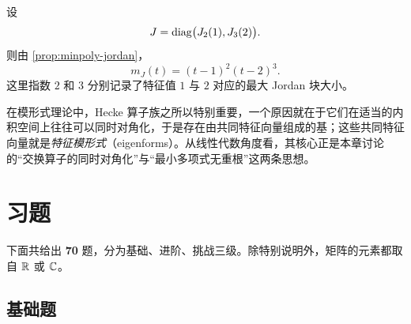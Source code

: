 \begin{example}
设
\[
J=\mathrm{diag}\bigl(J_2(1),J_3(2)\bigr).
\]
则由 \cref{prop:minpoly-jordan}，
\[
m_J(t)=(t-1)^2(t-2)^3.
\]
这里指数 \(2\) 和 \(3\) 分别记录了特征值 \(1\) 与 \(2\) 对应的最大 Jordan 块大小。
\end{example}

\begin{remark}
在模形式理论中，Hecke 算子族之所以特别重要，一个原因就在于它们在适当的内积空间上往往可以同时对角化，于是存在由共同特征向量组成的基；这些共同特征向量就是\emph{特征模形式}（eigenforms）。从线性代数角度看，其核心正是本章讨论的“交换算子的同时对角化”与“最小多项式无重根”这两条思想。
\end{remark}

\section*{习题}

下面共给出 \textbf{70} 题，分为基础、进阶、挑战三级。除特别说明外，矩阵的元素都取自 \(\mathbb{R}\) 或 \(\mathbb{C}\)。

\subsection*{基础题}

